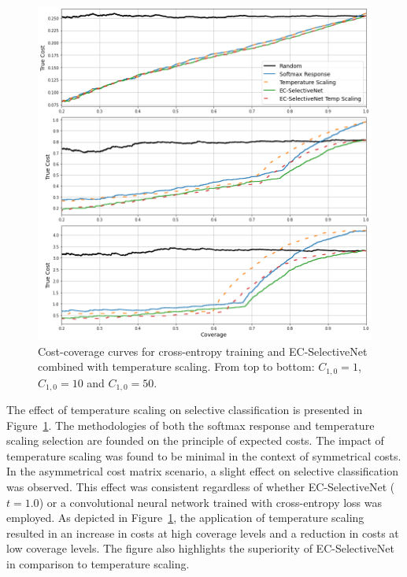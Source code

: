 \begin{figure}[!h]
	\centering
	\includegraphics[width=\textwidth]{images/binary_asymetrical.png}
	\caption{Cost-coverage curves for cross-entropy training and EC-SelectiveNet combined with temperature scaling. From top to bottom: $C_{1,0}=1$, $C_{1,0}=10$ and $C_{1,0}=50$.}
	\label{fig:binary-asymetric}
\end{figure}

The effect of temperature scaling on selective classification is presented in Figure~\ref{fig:binary-asymetric}. The methodologies of both the softmax response and temperature scaling selection are founded on the principle of expected costs. The impact of temperature scaling was found to be minimal in the context of symmetrical costs. In the asymmetrical cost matrix scenario, a slight effect on selective classification was observed. This effect was consistent regardless of whether EC-SelectiveNet ($t=1.0$) or a convolutional neural network trained with cross-entropy loss was employed. As depicted in Figure~\ref{fig:binary-asymetric}, the application of temperature scaling resulted in an increase in costs at high coverage levels and a reduction in costs at low coverage levels. The figure also highlights the superiority of EC-SelectiveNet in comparison to temperature scaling.



